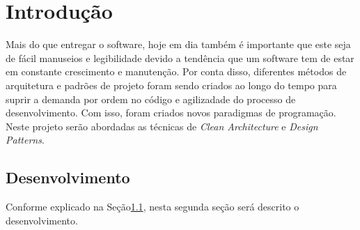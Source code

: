 \chapter{\thechapter \hspace{3mm} Introdução} \label{cap:introduction}

Mais do que entregar o software, hoje em dia também é importante que este seja de fácil manuseios e legibilidade devido a tendência que um software tem de estar em constante crescimento e manutenção. Por conta disso, diferentes métodos de arquitetura e padrões de projeto foram sendo criados ao longo do tempo para suprir a demanda por ordem no código e agilizadade do processo de desenvolvimento.
Com isso, foram criados novos paradigmas de programação. 
Neste projeto serão abordadas as técnicas de \emph{Clean Architecture} e \emph{Design Patterns}.

\section{Desenvolvimento}\label{sec:desenv}

Conforme explicado na Seção\ref{sec:desenv}, nesta segunda seção será descrito o desenvolvimento.